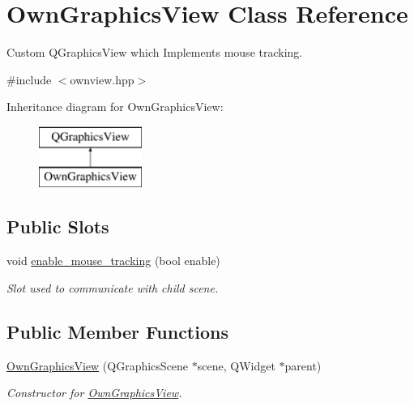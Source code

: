 \hypertarget{classOwnGraphicsView}{}\section{Own\+Graphics\+View Class Reference}
\label{classOwnGraphicsView}


Custom Q\+Graphics\+View which Implements mouse tracking.  




{\ttfamily \#include $<$ownview.\+hpp$>$}

Inheritance diagram for Own\+Graphics\+View\+:\begin{figure}[H]
\begin{center}
\leavevmode
\includegraphics[height=2.000000cm]{classOwnGraphicsView}
\end{center}
\end{figure}
\subsection*{Public Slots}
\begin{DoxyCompactItemize}
\item 
void \mbox{\hyperlink{classOwnGraphicsView_a4902ca3c748bc13040c4d869bf7be291}{enable\+\_\+mouse\+\_\+tracking}} (bool enable)
\begin{DoxyCompactList}\small\item\em Slot used to communicate with child scene. \end{DoxyCompactList}\end{DoxyCompactItemize}
\subsection*{Public Member Functions}
\begin{DoxyCompactItemize}
\item 
\mbox{\hyperlink{classOwnGraphicsView_a57f2f9617077ce2a1d30ec3f6c7144db}{Own\+Graphics\+View}} (Q\+Graphics\+Scene $\ast$scene, Q\+Widget $\ast$parent)
\begin{DoxyCompactList}\small\item\em Constructor for \mbox{\hyperlink{classOwnGraphicsView}{Own\+Graphics\+View}}. \end{DoxyCompactList}\end{DoxyCompactItemize}


